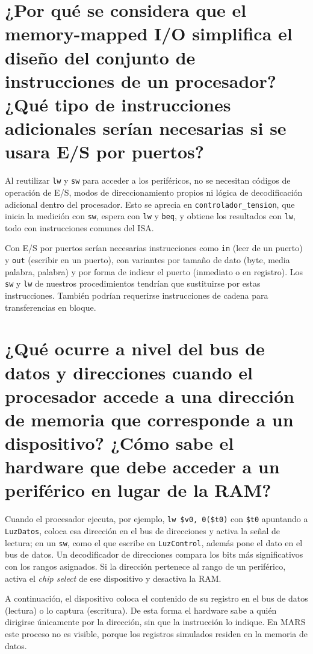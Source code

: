 \documentclass[12pt,a4paper]{article}
\begin{document}
\section{¿Por qué se considera que el memory-mapped I/O simplifica el diseño del conjunto de instrucciones de un procesador? ¿Qué tipo de instrucciones adicionales serían necesarias si se usara E/S por puertos?}

Al reutilizar \texttt{lw} y \texttt{sw} para acceder a los periféricos, no se necesitan códigos de operación de E/S, modos de direccionamiento propios ni lógica de decodificación adicional dentro del procesador. Esto se aprecia en \texttt{controlador\_tension}, que inicia la medición con \texttt{sw}, espera con \texttt{lw} y \texttt{beq}, y obtiene los resultados con \texttt{lw}, todo con instrucciones comunes del ISA.

Con E/S por puertos serían necesarias instrucciones como \texttt{in} (leer de un puerto) y \texttt{out} (escribir en un puerto), con variantes por tamaño de dato (byte, media palabra, palabra) y por forma de indicar el puerto (inmediato o en registro). Los \texttt{sw} y \texttt{lw} de nuestros procedimientos tendrían que sustituirse por estas instrucciones. También podrían requerirse instrucciones de cadena para transferencias en bloque.

\section{¿Qué ocurre a nivel del bus de datos y direcciones cuando el procesador accede a una dirección de memoria que corresponde a un dispositivo? ¿Cómo sabe el hardware que debe acceder a un periférico en lugar de la RAM?}

Cuando el procesador ejecuta, por ejemplo, \texttt{lw \$v0, 0(\$t0)} con \texttt{\$t0} apuntando a \texttt{LuzDatos}, coloca esa dirección en el bus de direcciones y activa la señal de lectura; en un \texttt{sw}, como el que escribe en \texttt{LuzControl}, además pone el dato en el bus de datos. Un decodificador de direcciones compara los bits más significativos con los rangos asignados. Si la dirección pertenece al rango de un periférico, activa el \emph{chip select} de ese dispositivo y desactiva la RAM.

A continuación, el dispositivo coloca el contenido de su registro en el bus de datos (lectura) o lo captura (escritura). De esta forma el hardware sabe a quién dirigirse únicamente por la dirección, sin que la instrucción lo indique. En MARS este proceso no es visible, porque los registros simulados residen en la memoria de datos.
\end{document}
